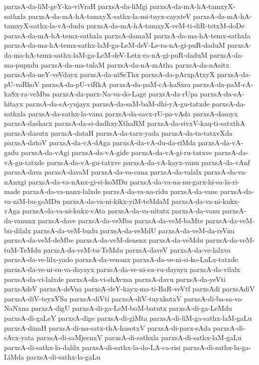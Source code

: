 {parxsA-da-liM-geY-ka-viVraH
parxsA-da-liMgi
parxsA-da-mA-hA-tamxyX-sathxla
parxsA-da-mA-hA-tamxyX-sathx-la-mi-tuyx-cayxteV
parxsA-da-mA-hA-tamxyX-sathx-la-vA-dudu
parxsA-da-mA-hA-tamxyX-veM-ti-diR-tetxM-doDe
parxsA-da-mA-hA-temx-sathxla
parxsA-damaM
parxsA-da-ma-hA-temx-sathxla
parxsA-da-ma-hA-temx-sathx-laM-ga-LeM-deV-Le-ra-nA-gi-puR-daduM
parxsA-da-ma-hA-temx-sathx-laM-ga-LeM-deV-Letx-ra-nA-gi-puR-daduM
parxsA-da-ma-pupxdu
parxsA-da-ma-tulaM
parxsA-da-nA-mAtha
parxsA-da-nAsitx
parxsA-da-neY-veVdayx
parxsA-da-niSeThx
parxsA-da-pArxpAtxyX
parxsA-da-pU-vaRkoV
parxsA-da-pU-viRkA
parxsA-da-paM-cA-kaSxra
parxsA-da-paM-cA-kaSx-ra-veMba
parxsA-da-parx-Na-va-do-Lage
parxsA-da-rUpa
parxsA-da-sA-hitayx
parxsA-da-sA-yujayx
parxsA-da-saM-baM-dhi-yA-gu-tatxde
parxsA-da-sathxla
parxsA-da-sathx-la-vana
parxsA-da-savx-rU-pa-vAda
parxsA-dasayx
parxsA-dashacx
parxsA-da-si-dadhxyXthaRM
parxsA-da-sivxV-kaq-ti-satxthA
parxsA-dasutx
parxsA-dataH
parxsA-da-tarx-yada
parxsA-da-ta-tatxvXda
parxsA-datoV
parxsA-da-vA-dAga
parxsA-da-vA-du-da-riMda
parxsA-da-vA-gadu
parxsA-da-vAgi
parxsA-da-vA-gide
parxsA-da-vA-gi-ru-tatxve
parxsA-da-vA-gu-tatxde
parxsA-da-vA-gu-tatxve
parxsA-da-vA-kayx-vanu
parxsA-da-vAnf
parxsA-dava
parxsA-davaM
parxsA-da-va-cana
parxsA-da-valalx
parxsA-da-va-nAnxgi
parxsA-da-va-nAnx-gi-si-koMDu
parxsA-da-va-na-nu-garx-hi-sa-la-ri-made
parxsA-da-va-nanx-lalxde
parxsA-da-va-na-ridu
parxsA-da-vane
parxsA-da-va-niM-bu-goMDu
parxsA-da-va-ni-kikx-yiM-teMdaM
parxsA-da-va-ni-kukx-vAga
parxsA-da-va-ni-kukx-vAta
parxsA-da-va-nitutx
parxsA-da-vanu
parxsA-da-vanunx
parxsA-dave
parxsA-da-veMba
parxsA-da-veM-baMte
parxsA-da-veM-bu-dilalx
parxsA-da-veM-budu
parxsA-da-veMdU
parxsA-da-veM-da-reVnu
parxsA-da-veM-deMbe
parxsA-da-veM-denenx
parxsA-da-veMdu
parxsA-da-veM-tuM-TeMdu
parxsA-da-veM-tu-TeMdu
parxsA-daveV
parxsA-da-ve-lalxva
parxsA-da-ve-lilx-yado
parxsA-da-venanx
parxsA-da-ve-ni-si-ko-LuLx-tatxde
parxsA-da-ve-ni-su-va-dayayx
parxsA-da-ve-ni-su-vu-dayayx
parxsA-da-vilalx
parxsA-da-vi-lalxde
parxsA-da-vi-shAvxsa
parxsA-davu
parxsA-da-yeVti
parxsAdeV
parxsA-deVna
parxsA-deY-kayx-ma-ti-BaR-veVtf
parxsAdi
parxsAdiV
parxsA-diV-teyxVSa
parxsA-diVti
parxsA-diV-tuyxkotxV
parxsA-di-ba-sa-va-NaNxna
parxsA-digU
parxsA-di-ga-LeM-boM-batutx
parxsA-di-ga-LeMdu
parxsA-di-gaLeY
parxsA-dige
parxsA-di-giMta
parxsA-di-liM-ga-sathx-laM-gaLu
parxsA-dinaH
parxsA-di-na-satx-thA-hasotxV
parxsA-di-parx-sAda
parxsA-di-sAvx-yata
parxsA-di-saMjecnxV
parxsA-di-sathxla
parxsA-di-sathx-laM-gaLu
parxsA-di-sathx-la-dalilx
parxsA-di-sathx-la-do-LA-ca-risi
parxsA-di-sathx-la-ga-LiMda
parxsA-di-sathx-la-gaLu
}
